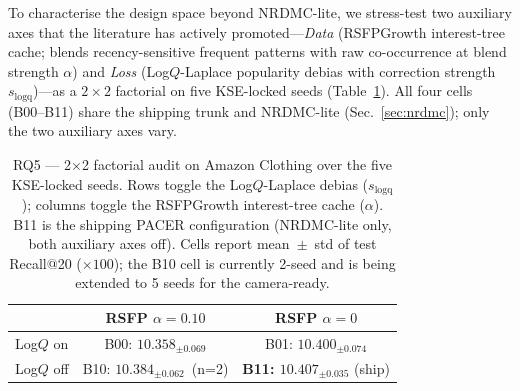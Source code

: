 \documentclass[conference]{IEEEtran}
\begin{document}
To characterise the design space beyond NRDMC-lite, we stress-test
two auxiliary axes that the literature has actively
promoted---\emph{Data} (RSFPGrowth interest-tree cache; blends
recency-sensitive frequent patterns with raw co-occurrence at blend
strength $\alpha$) and \emph{Loss} (Log$Q$-Laplace popularity debias
with correction strength $s_{\text{logq}}$)---as a
$2{\times}2$ factorial on five KSE-locked seeds
(Table~\ref{tab:factorial}). All four cells (B00--B11) share the
shipping trunk and NRDMC-lite (Sec.~\ref{sec:nrdmc}); only the two
auxiliary axes vary.

\begin{table}[!t]
\caption{RQ5 --- 2$\times$2 factorial audit on Amazon Clothing over
the five KSE-locked seeds. Rows toggle the Log$Q$-Laplace debias
($s_{\text{logq}}$); columns toggle the RSFPGrowth interest-tree
cache ($\alpha$). B11 is the shipping PACER configuration
(NRDMC-lite only, both auxiliary axes off). Cells report
mean~$\pm$~std of test Recall@20 ($\times 100$); the B10 cell is
currently 2-seed and is being extended to 5 seeds for the
camera-ready.}
\label{tab:factorial}
\centering
\renewcommand{\arraystretch}{1.10}
\setlength{\tabcolsep}{5pt}
\begin{tabular}{lcc}
\toprule
& RSFP $\alpha{=}0.10$ & RSFP $\alpha{=}0$ \\
\midrule
Log$Q$ on  & B00: $10.358_{\pm 0.069}$ & B01: $10.400_{\pm 0.074}$ \\
Log$Q$ off & B10: $10.384_{\pm 0.062}$~\scriptsize{(n=2)} & \textbf{B11: $\mathbf{10.407_{\pm 0.035}}$} (ship) \\
\bottomrule
\end{tabular}
\end{table}
\end{document}
